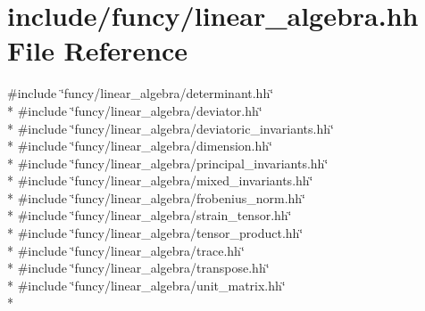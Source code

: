 \hypertarget{linear__algebra_8hh}{\section{include/funcy/linear\-\_\-algebra.hh File Reference}
\label{linear__algebra_8hh}
}
{\ttfamily \#include \char`\"{}funcy/linear\-\_\-algebra/determinant.\-hh\char`\"{}}\\*
{\ttfamily \#include \char`\"{}funcy/linear\-\_\-algebra/deviator.\-hh\char`\"{}}\\*
{\ttfamily \#include \char`\"{}funcy/linear\-\_\-algebra/deviatoric\-\_\-invariants.\-hh\char`\"{}}\\*
{\ttfamily \#include \char`\"{}funcy/linear\-\_\-algebra/dimension.\-hh\char`\"{}}\\*
{\ttfamily \#include \char`\"{}funcy/linear\-\_\-algebra/principal\-\_\-invariants.\-hh\char`\"{}}\\*
{\ttfamily \#include \char`\"{}funcy/linear\-\_\-algebra/mixed\-\_\-invariants.\-hh\char`\"{}}\\*
{\ttfamily \#include \char`\"{}funcy/linear\-\_\-algebra/frobenius\-\_\-norm.\-hh\char`\"{}}\\*
{\ttfamily \#include \char`\"{}funcy/linear\-\_\-algebra/strain\-\_\-tensor.\-hh\char`\"{}}\\*
{\ttfamily \#include \char`\"{}funcy/linear\-\_\-algebra/tensor\-\_\-product.\-hh\char`\"{}}\\*
{\ttfamily \#include \char`\"{}funcy/linear\-\_\-algebra/trace.\-hh\char`\"{}}\\*
{\ttfamily \#include \char`\"{}funcy/linear\-\_\-algebra/transpose.\-hh\char`\"{}}\\*
{\ttfamily \#include \char`\"{}funcy/linear\-\_\-algebra/unit\-\_\-matrix.\-hh\char`\"{}}\\*
